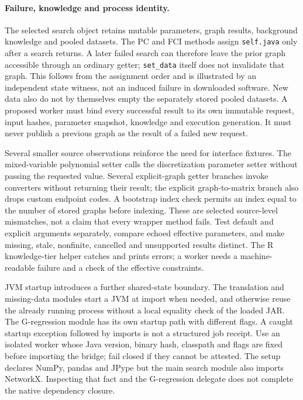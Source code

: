 \paragraph{Failure, knowledge and process identity.}
The selected search object retains mutable parameters, graph results,
background knowledge and pooled datasets. The PC and FCI methods assign
\texttt{self.java} only after a search returns. A later failed search can
therefore leave the prior graph accessible through an ordinary getter;
\texttt{set\_data} itself does not invalidate that graph. This follows from
the assignment order and is illustrated by an independent state witness,
not an induced failure in downloaded software. New data also do not by
themselves empty the separately stored pooled datasets. A proposed worker
must bind every successful result to its own immutable request, input hashes,
parameter snapshot, knowledge and execution generation. It must never publish
a previous graph as the result of a failed new request.
\citep{exec24_pytetrad_source,exec24_pytetrad_choice}

Several smaller source observations reinforce the need for interface fixtures.
The mixed-variable polynomial setter calls the discretization parameter setter
without passing the requested value. Several explicit-graph getter branches
invoke converters without returning their result; the explicit graph-to-matrix
branch also drops custom endpoint codes. A bootstrap index check permits an
index equal to the number of stored graphs before indexing. These are selected
source-level mismatches, not a claim that every wrapper method fails. Test
default and explicit arguments separately, compare echoed effective parameters,
and make missing, stale, nonfinite, cancelled and unsupported results distinct.
The R knowledge-tier helper catches and prints errors; a worker needs a
machine-readable failure and a check of the effective constraints.
\citep{exec24_pytetrad_source}

JVM startup introduces a further shared-state boundary. The translation and
missing-data modules start a JVM at import when needed, and otherwise reuse
the already running process without a local equality check of the loaded JAR.
The G-regression module has its own startup path with different flags. A caught
startup exception followed by imports is not a structured job receipt. Use an
isolated worker whose Java version, binary hash, classpath and flags are fixed
before importing the bridge; fail closed if they cannot be attested. The setup
declares NumPy, pandas and JPype but the main search module also imports
NetworkX. Inspecting that fact and the G-regression delegate does not complete
the native dependency closure.\citep{exec24_pytetrad_source}

